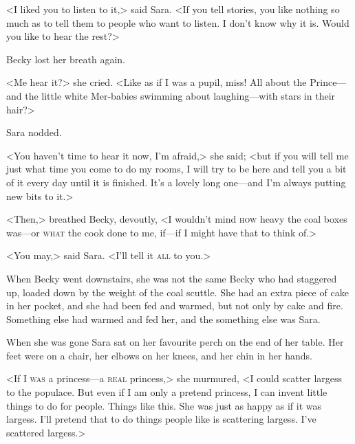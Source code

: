 <I liked you to listen to it,> said Sara. <If you tell stories, you like nothing so much as to tell them to people who want to listen. I don't know why it is. Would you like to hear the rest?>

Becky lost her breath again.

<Me hear it?> she cried. <Like as if I was a pupil, miss! All about the Prince—and the little white Mer-babies swimming about laughing—with stars in their hair?>

Sara nodded.

<You haven't time to hear it now, I'm afraid,> she said; <but if you will tell me just what time you come to do my rooms, I will try to be here and tell you a bit of it every day until it is finished. It's a lovely long one—and I'm always putting new bits to it.>

<Then,> breathed Becky, devoutly, <I wouldn't mind \textsc{how} heavy the coal boxes was—or \textsc{what} the cook done to me, if—if I might have that to think of.>

<You may,> said Sara. <I'll tell it \textsc{all} to you.>

When Becky went downstairs, she was not the same Becky who had staggered up, loaded down by the weight of the coal scuttle. She had an extra piece of cake in her pocket, and she had been fed and warmed, but not only by cake and fire. Something else had warmed and fed her, and the something else was Sara.

When she was gone Sara sat on her favourite perch on the end of her table. Her feet were on a chair, her elbows on her knees, and her chin in her hands.

<If I \textsc{was} a princess—a \textsc{real} princess,> she murmured, <I could scatter largess to the populace. But even if I am only a pretend princess, I can invent little things to do for people. Things like this. She was just as happy as if it was largess. I'll pretend that to do things people like is scattering largess. I've scattered largess.>

